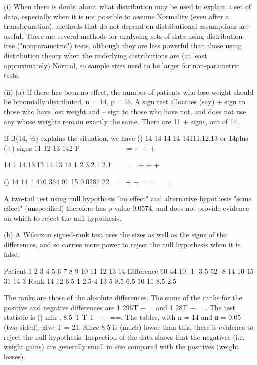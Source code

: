 \documentclass[a4paper,12pt]{article}
\begin{document}
 
(i) When there is doubt about what distribution may be used to explain a set of data, especially when it is not possible to assume Normality (even after a transformation), methods that do not depend on distributional assumptions are useful.  There are several methods for analysing sets of data using distribution-free ("nonparametric") tests, although they are less powerful than those using distribution theory when the underlying distributions are (at least approximately) Normal, so sample sizes need to be larger for non-parametric tests. 
 
(ii) (a) If there has been no effect, the number of patients who lose weight should be binomially distributed, n = 14, p = ½.  A sign test allocates (say) + sign to those who have lost weight and – sign to those who have not, and does not use any whose weights remain exactly the same.  There are 11 + signs, out of 14. 
 
If B(14, ½) explains the situation, we have () 14 14 14 14 14111,12,13 or 14plus (+) signs 11 12 13 142 P          = + + +                   
 
  
14 1 14.13.12 14.13 14 1 2 3.2.1 2.1     = + + +        
 
()
14
14 1 470 364 91 15 0.0287 22  = + + = =   . 
 
A two-tail test using null hypothesis "no effect" and alternative hypothesis "some effect" (unspecified) therefore has p-value 0.0574, and does not provide evidence on which to reject the null hypothesis. 
 
(b) A Wilcoxon signed-rank test uses the sizes as well as the signs of the differences, and so carries more power to reject the null hypothesis when it is false. 
 
Patient 1 2 3 4 5 6 7 8 9 10 11 12 13 14 Difference 60 44 10 -1 -3 5 52 -8 14 10 15 31 14 3 Rank 14 12 6.5 1 2.5 4 13 5 8.5 6.5 10 11 8.5 2.5 
 
The ranks are those of the absolute differences.  The sums of the ranks for the positive and negative differences are 1 296T + = and 1 28T − = .  The test statistic is () min , 8.5 T T T −+ ==.  The tables, with n = 14 and α = 0.05 (two-sided), give T = 21.  Since 8.5 is (much) lower than this, there is evidence to reject the null hypothesis.  Inspection of the data shows that the negatives (i.e. weight gains) are generally small in size compared with the positives (weight losses). 
\end{document}
